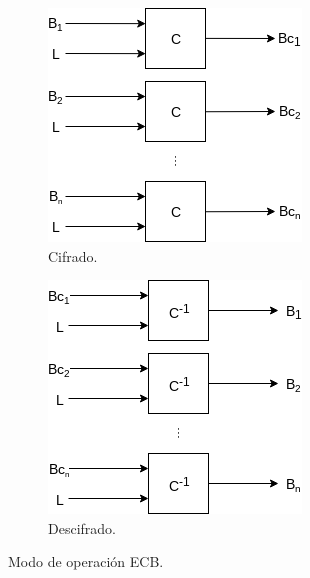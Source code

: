 \begin{figure}[H]
  \centering
  \begin{subfigure}{0.45\textwidth}
      \begin{center}
          \includegraphics[width=0.7\linewidth]
            {contenidos/antecedentes/diagramas/modo_ecb.png}
          \caption{Cifrado.}
      \end{center}
  \end{subfigure}
  \begin{subfigure}{0.45\textwidth}
      \begin{center}
          \includegraphics[width=0.7\linewidth]
            {contenidos/antecedentes/diagramas/modo_ecb_inverso.png}
          \caption{Descifrado.}
      \end{center}
  \end{subfigure}
  \caption{Modo de operación ECB.}
\end{figure}


